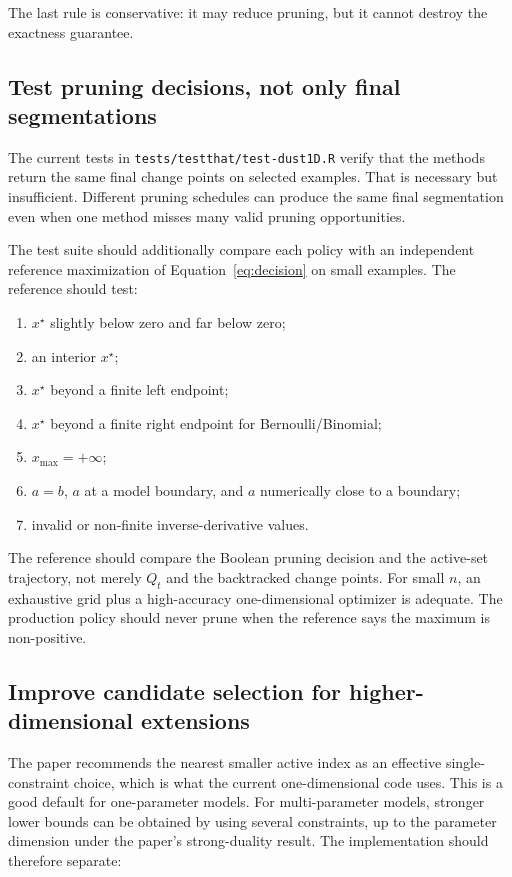 \documentclass[11pt]{article}
\begin{document}
The last rule is conservative: it may reduce pruning, but it cannot destroy
the exactness guarantee.

\subsection{Test pruning decisions, not only final segmentations}

The current tests in \texttt{tests/testthat/test-dust1D.R} verify that the
methods return the same final change points on selected examples.  That is
necessary but insufficient.  Different pruning schedules can produce the
same final segmentation even when one method misses many valid pruning
opportunities.

The test suite should additionally compare each policy with an independent
reference maximization of Equation~\eqref{eq:decision} on small examples.
The reference should test:

\begin{enumerate}
  \item $x^\star$ slightly below zero and far below zero;
  \item an interior $x^\star$;
  \item $x^\star$ beyond a finite left endpoint;
  \item $x^\star$ beyond a finite right endpoint for Bernoulli/Binomial;
  \item $x_{\max}=+\infty$;
  \item $a=b$, $a$ at a model boundary, and $a$ numerically close to a
        boundary;
  \item invalid or non-finite inverse-derivative values.
\end{enumerate}

The reference should compare the Boolean pruning decision and the active-set
trajectory, not merely $Q_t$ and the backtracked change points.  For small
$n$, an exhaustive grid plus a high-accuracy one-dimensional optimizer is
adequate.  The production policy should never prune when the reference says
the maximum is non-positive.

\subsection{Improve candidate selection for higher-dimensional extensions}

The paper recommends the nearest smaller active index as an effective
single-constraint choice, which is what the current one-dimensional code
uses.  This is a good default for one-parameter models.  For multi-parameter
models, stronger lower bounds can be obtained by using several constraints,
up to the parameter dimension under the paper's strong-duality result.
The implementation should therefore separate:
\end{document}
